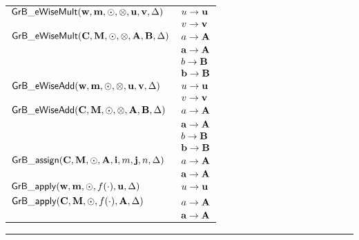 \begin{table}[htb]
\begin{center}
\begin{tabular}{|l|l|}
			\hline
			${\sf GrB\_eWiseMult}({\bf w},{\bf m},\odot,\otimes,{\bf u},{\bf v},\Delta)$& $u \rightarrow {\bf u}$ \\
														& $v \rightarrow {\bf v}$ \\
			\hline
			${\sf GrB\_eWiseMult}({\bf C},{\bf M},\odot,\otimes,{\bf A},{\bf B},\Delta)$& $a \rightarrow {\bf A}$ \\
                                                                                                                & ${\bf a} \rightarrow {\bf A}$ \\
														& $b \rightarrow {\bf B}$ \\
                                                                                                                & ${\bf b} \rightarrow {\bf B}$ \\
			\hline
			${\sf GrB\_eWiseAdd}({\bf w},{\bf m},\odot,\otimes,{\bf u},{\bf v},\Delta)$ & $u \rightarrow {\bf u}$ \\
														& $v \rightarrow {\bf v}$ \\
			\hline
			${\sf GrB\_eWiseAdd}({\bf C},{\bf M},\odot,\otimes,{\bf A},{\bf B},\Delta)$ & $a \rightarrow {\bf A}$ \\
                                                                                                                & ${\bf a} \rightarrow {\bf A}$ \\
														& $b \rightarrow {\bf B}$ \\
                                                                                                                & ${\bf b} \rightarrow {\bf B}$ \\
			\hline
			${\sf GrB\_assign}({\bf C},{\bf M},\odot,{\bf A},{\bf i},m,{\bf j},n,\Delta)$& $a \rightarrow {\bf A}$ \\
														    & ${\bf a} \rightarrow {\bf A}$ \\
			\hline
			${\sf GrB\_apply}({\bf w},{\bf m},\odot,f(\cdot),{\bf u},\Delta)$		&  $u \rightarrow {\bf u}$ \\
			\hline
			${\sf GrB\_apply}({\bf C},{\bf M},\odot,f(\cdot),{\bf A},\Delta)$		& $a \rightarrow {\bf A}$ \\
                                                                                                                & ${\bf a} \rightarrow {\bf A}$ \\
			\hline
		\end{tabular}
	\end{center}
	\hrule
\end{table}
